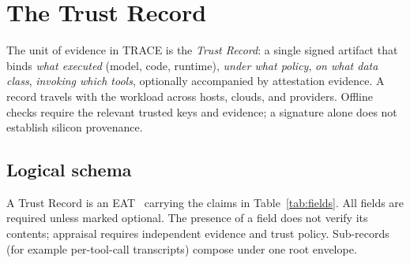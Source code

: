 \section{The Trust Record}
\label{sec:model}

The unit of evidence in TRACE is the \emph{Trust Record}: a single signed artifact
that binds \emph{what executed} (model, code, runtime), \emph{under what policy},
\emph{on what data class}, \emph{invoking which tools}, optionally accompanied by attestation evidence. A record travels with the workload
across hosts, clouds, and providers. Offline checks require the relevant trusted
keys and evidence; a signature alone does not establish silicon provenance.

\subsection{Logical schema}

A Trust Record is an EAT~\citep{eat2023} carrying the claims in
Table~\ref{tab:fields}. All fields are required unless marked optional. The presence of a field does not verify its contents; appraisal requires
independent evidence and trust policy. Sub-records (for example per-tool-call transcripts)
compose under one root envelope.

